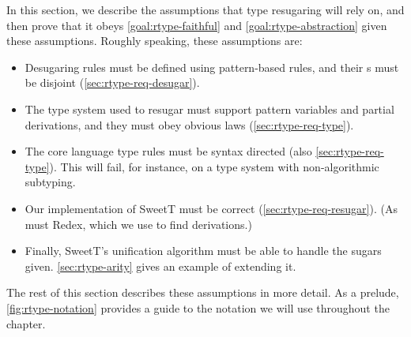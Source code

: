 In this section, we describe the assumptions that type resugaring will
rely on, and then prove that it obeys
\cref{goal:rtype-faithful} and \cref{goal:rtype-abstraction} given these assumptions.
Roughly speaking, these assumptions are:
\begin{itemize}
  \item Desugaring rules must be defined using pattern-based rules,
    and their s must be disjoint (\cref{sec:rtype-req-desugar}).
  \item The type system used
    to resugar must support pattern variables and partial
    derivations, and they must obey obvious laws (\cref{sec:rtype-req-type}).
  \item The core language type rules must be syntax directed
    (also \cref{sec:rtype-req-type}). This will fail, for instance, on a
    type system with non-algorithmic subtyping.
  \item Our implementation of SweetT must be correct
    (\cref{sec:rtype-req-resugar}). (As must Redex, which we use to find
    derivations.)
  \item Finally, SweetT's unification algorithm must be able to handle
    the sugars given. \cref{sec:rtype-arity} gives an example of extending it.
\end{itemize}

The rest of this section describes these assumptions in more
detail. As a prelude, \cref{fig:rtype-notation} provides a guide to the
notation we will use throughout the chapter.

